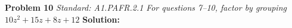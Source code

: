 \documentclass[11pt]{article}
\begin{document}
\begin{minipage}{\textwidth}
\noindent\textbf{Problem 10}
\hfill\textit{\color{gray}Standard: A1.PAFR.2.1}
\vspace{0.3em}
\noindent\textit{For questions 7–10, factor by grouping}
\vspace{0.3em}
\noindent $10z^{2} + 15z + 8z + 12$
\vspace{0.5em}
\noindent\textbf{Solution:} 
\end{minipage}
\vspace{1.5em}
\hrulefill
\vspace{1.5em}
\end{document}
